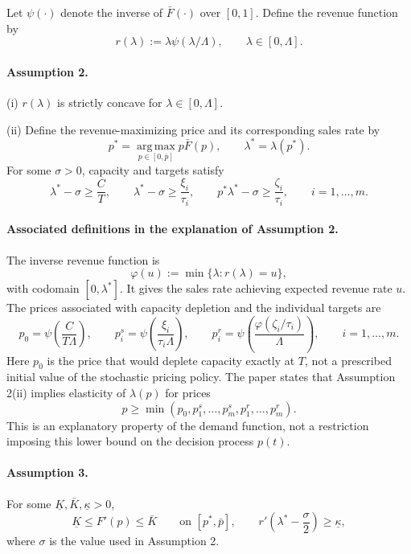 \documentclass{article}
\begin{document}
Let $\psi(\cdot)$ denote the inverse of $\bar F(\cdot)$ over $[0,1]$. Define the revenue function by
\[
r(\lambda):=\lambda\psi(\lambda/\Lambda),
\qquad \lambda\in[0,\Lambda].
\]

\paragraph{Assumption 2.}
(i) $r(\lambda)$ is strictly concave for $\lambda\in[0,\Lambda]$.

(ii) Define the revenue-maximizing price and its corresponding sales rate by
\[
p^*=\operatorname*{arg\,max}_{p\in[0,\bar p]}p\bar F(p),
\qquad \lambda^*=\lambda(p^*).
\]
For some $\sigma>0$, capacity and targets satisfy
\[
\lambda^*-\sigma\ge\frac{C}{T},
\qquad
\lambda^*-\sigma\ge\frac{\xi_i}{\tau_i},
\qquad
p^*\lambda^*-\sigma\ge\frac{\zeta_i}{\tau_i},
\qquad i=1,\ldots,m.
\]

\paragraph{Associated definitions in the explanation of Assumption 2.}
The inverse revenue function is
\begin{equation}
\varphi(u):=\min\{\lambda:r(\lambda)=u\},
\tag{5}
\end{equation}
with codomain $[0,\lambda^*]$. It gives the sales rate achieving expected revenue rate $u$. The prices associated with capacity depletion and the individual targets are
\[
p_0=\psi\!\left(\frac{C}{T\Lambda}\right),
\qquad
p_i^s=\psi\!\left(\frac{\xi_i}{\tau_i\Lambda}\right),
\qquad
p_i^r=\psi\!\left(\frac{\varphi(\zeta_i/\tau_i)}{\Lambda}\right),
\qquad i=1,\ldots,m.
\]
Here $p_0$ is the price that would deplete capacity exactly at $T$, not a prescribed initial value of the stochastic pricing policy. The paper states that Assumption 2(ii) implies elasticity of $\lambda(p)$ for prices
\[
p\ge\min(p_0,p_1^s,\ldots,p_m^s,p_1^r,\ldots,p_m^r).
\]
This is an explanatory property of the demand function, not a restriction imposing this lower bound on the decision process $p(t)$.

\paragraph{Assumption 3.}
For some $\underline K,\bar K,\underline\kappa>0$,
\[
\underline K\le F'(p)\le\bar K
\qquad\text{on }[p^*,\bar p],
\qquad
r'\!\left(\lambda^*-\frac{\sigma}{2}\right)
\ge\underline\kappa,
\]
where $\sigma$ is the value used in Assumption 2.
\end{document}
